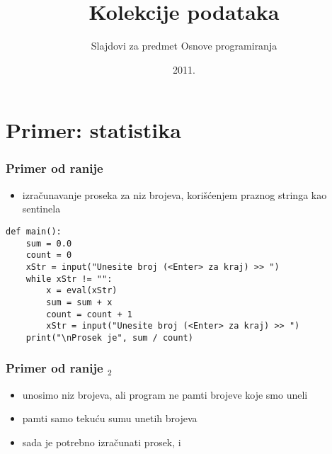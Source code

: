 \documentclass[utf8,compress]{beamer}
\title{Kolekcije podataka}
\subtitle{\tiny{Slajdovi za predmet Osnove programiranja}}
\institute{Katedra za informatiku, Fakultet tehničkih nauka, Novi Sad}
\date{2011.}
\begin{document}
\frame{\titlepage}


\section[Primer]{Primer: statistika}


\begin{frame}[fragile]
  \frametitle{Primer od ranije}
  \begin{itemize}
    \item izračunavanje proseka za niz brojeva, korišćenjem praznog stringa kao sentinela
  \end{itemize}
\begin{verbatim}
def main():
    sum = 0.0
    count = 0
    xStr = input("Unesite broj (<Enter> za kraj) >> ")
    while xStr != "":
        x = eval(xStr)
        sum = sum + x
        count = count + 1
        xStr = input("Unesite broj (<Enter> za kraj) >> ")
    print("\nProsek je", sum / count)
\end{verbatim}
\end{frame}

\begin{frame}[fragile]
  \frametitle{Primer od ranije $_2$}
  \begin{itemize}
    \item unosimo niz brojeva, ali program ne pamti  brojeve koje smo uneli
    \item pamti samo tekuću sumu unetih brojeva
    \item sada je potrebno izračunati prosek,  i 
  \end{itemize}
\end{frame}
\end{document}
